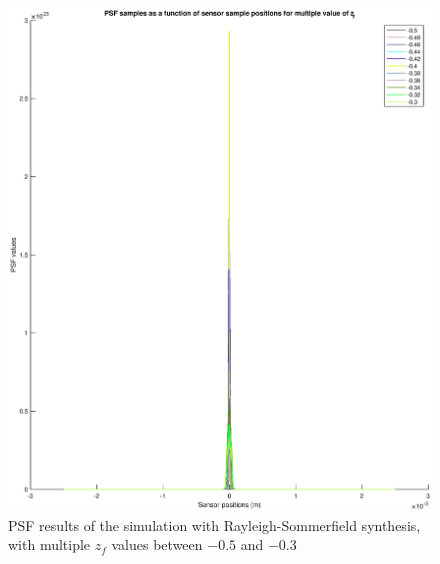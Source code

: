 \documentclass[12pt,a4paper,english
]{tunithesis}
\begin{document}
\begin{figure}
  \label{fig:psf_multiple_rs}
  \centering
  \includegraphics[width=\columnwidth]{img/psf_multiple_rs.eps}
  \caption{PSF results of the simulation with Rayleigh-Sommerfield synthesis, with multiple $z_f$ values between $-0.5$ and $-0.3$}
\end{figure}
\end{document}
